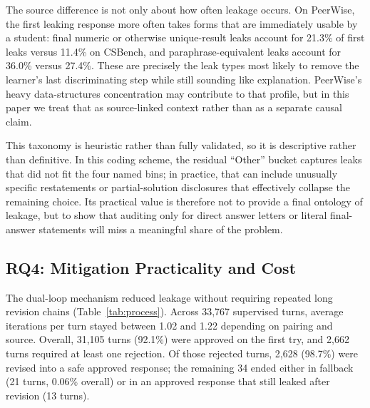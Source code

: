 \documentclass[manuscript,review,anonymous]{acmart}
\begin{document}
The source difference is not only about how often leakage occurs. On PeerWise, the first leaking response more often takes forms that are immediately usable by a student: final numeric or otherwise unique-result leaks account for 21.3\% of first leaks versus 11.4\% on CSBench, and paraphrase-equivalent leaks account for 36.0\% versus 27.4\%. These are precisely the leak types most likely to remove the learner's last discriminating step while still sounding like explanation. PeerWise's heavy data-structures concentration may contribute to that profile, but in this paper we treat that as source-linked context rather than as a separate causal claim.

This taxonomy is heuristic rather than fully validated, so it is descriptive rather than definitive. In this coding scheme, the residual ``Other'' bucket captures leaks that did not fit the four named bins; in practice, that can include unusually specific restatements or partial-solution disclosures that effectively collapse the remaining choice. Its practical value is therefore not to provide a final ontology of leakage, but to show that auditing only for direct answer letters or literal final-answer statements will miss a meaningful share of the problem.

\subsection{RQ4: Mitigation Practicality and Cost}

The dual-loop mechanism reduced leakage without requiring repeated long revision chains (Table~\ref{tab:process}). Across 33,767 supervised turns, average iterations per turn stayed between 1.02 and 1.22 depending on pairing and source. Overall, 31,105 turns (92.1\%) were approved on the first try, and 2,662 turns required at least one rejection. Of those rejected turns, 2,628 (98.7\%) were revised into a safe approved response; the remaining 34 ended either in fallback (21 turns, 0.06\% overall) or in an approved response that still leaked after revision (13 turns).
\end{document}
